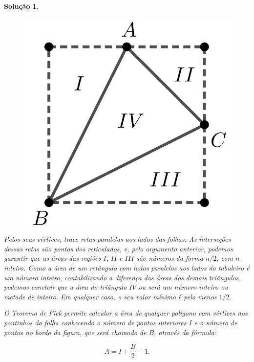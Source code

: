 \documentclass{hipatia}
\newtheorem*{solution*}{Solução}
\begin{document}
\begin{solution*}
\begin{enumerate}[a)]
\begin{figure}[htbp]
	\centering
		\includegraphics[scale=0.6]{F59.png}
\end{figure} 

\noindent Pelos seus vértices, trace retas paralelas aos lados das folhas. As interseções dessas retas são pontos dos reticulados, e, pelo argumento anterior, podemos garantir que as áreas das regiões $I$, $II$ e $III$ são números da forma $n/2$, com $n$ inteiro. Como a área de um retângulo com lados paralelos aos lados do tabuleiro é um número inteiro, contabilizando a diferença das áreas dos demais triângulos, podemos concluir que a área do triângulo $IV$ ou será um número inteiro ou metade de inteiro. Em qualquer caso, o seu valor mínimo é pelo menos $1/2$. 

\end{enumerate}

 O Teorema de Pick permite calcular a área de qualquer polígono com vértices nos pontinhos da folha conhecendo o número de pontos interiores $I$ e o número de pontos no bordo da figura, que será chamado de $B$, através da fórmula:

$$A = I + \dfrac{B}{2}-1.$$


\end{solution*}
\end{document}
